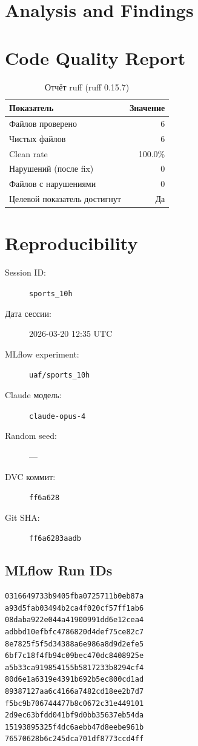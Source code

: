 \documentclass[12pt,a4paper]{article}
\begin{document}
\section{Analysis and Findings}









\section{Code Quality Report}

\begin{table}[H]
\centering
\caption{Отчёт ruff (ruff 0.15.7)}
\begin{tabular}{lr}
\toprule
Показатель & Значение \\
\midrule
Файлов проверено & 6 \\
Чистых файлов & 6 \\
Clean rate & \textcolor{passcolor}{100.0\%} \\
Нарушений (после fix) & \textcolor{passcolor}{0} \\
Файлов с нарушениями & 0 \\
Целевой показатель достигнут & \textcolor{passcolor}{Да} \\
\bottomrule
\end{tabular}
\end{table}





\section{Reproducibility}

\begin{description}
    \item[Session ID:] \texttt{sports\_10h}
    \item[Дата сессии:] 2026-03-20 12:35 UTC
    \item[MLflow experiment:] \texttt{uaf/sports\_10h}
    \item[Claude модель:] \texttt{claude-opus-4}
    \item[Random seed:] ---
    \item[DVC коммит:] \texttt{ff6a628}
    \item[Git SHA:] \texttt{ff6a6283aadb}
\end{description}

\subsection*{MLflow Run IDs}

\begin{lstlisting}
0316649733b9405fba0725711b0eb87a
a93d5fab03494b2ca4f020cf57ff1ab6
08daba922e044a41900991dd6e12cea4
adbbd10efbfc4786820d4def75ce82c7
8e7825f5f5d34388a6e986a8d9d2efe5
6bf7c18f4fb94c09bec470dc8408925e
a5b33ca919854155b5817233b8294cf4
80d6e1a6319e4391b692b5ec800cd1ad
89387127aa6c4166a7482cd18ee2b7d7
f5bc9b706744477b8c0672c31e449101
2d9ec63bfdd041bf9d0bb35637eb54da
15193895325f4dc6aebb47d8eebe961b
76570628b6c245dca701df8773ccd4ff
\end{lstlisting}
\end{document}
